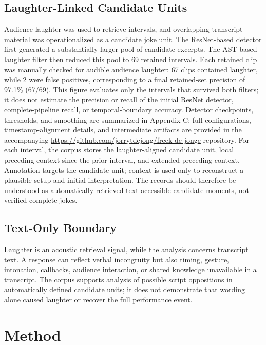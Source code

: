 \documentclass[11pt]{article}
\begin{document}
\subsection{Laughter-Linked Candidate Units}\label{laughter-linked-candidate-units}

Audience laughter was used to retrieve intervals, and overlapping transcript material was operationalized as a candidate joke unit. The ResNet-based detector first generated a substantially larger pool of candidate excerpts. The AST-based laughter filter then reduced this pool to 69 retained intervals. Each retained clip was manually checked for audible audience laughter: 67 clips contained laughter, while 2 were false positives, corresponding to a final retained-set precision of 97.1\% (67/69). This figure evaluates only the intervals that survived both filters; it does not estimate the precision or recall of the initial ResNet detector, complete-pipeline recall, or temporal-boundary accuracy. Detector checkpoints, thresholds, and smoothing are summarized in Appendix C; full configurations, timestamp-alignment details, and intermediate artifacts are provided in the accompanying \url{https://github.com/jorrytdejong/freek-de-jonge} repository. For each interval, the corpus stores the laughter-aligned candidate unit, local preceding context since the prior interval, and extended preceding context. Annotation targets the candidate unit; context is used only to reconstruct a plausible setup and initial interpretation. The records should therefore be understood as automatically retrieved text-accessible candidate moments, not verified complete jokes.

\subsection{Text-Only Boundary}\label{text-only-boundary}

Laughter is an acoustic retrieval signal, while the analysis concerns transcript text. A response can reflect verbal incongruity but also timing, gesture, intonation, callbacks, audience interaction, or shared knowledge unavailable in a transcript. The corpus supports analysis of possible script oppositions in automatically defined candidate units; it does not demonstrate that wording alone caused laughter or recover the full performance event.

\section{Method}\label{method}
\end{document}
